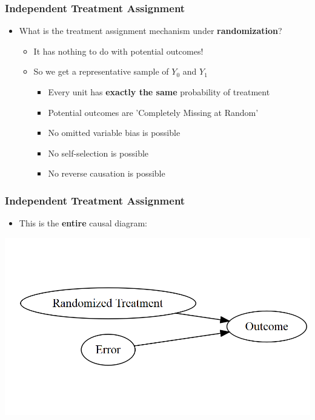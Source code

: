 \documentclass[xcolor=x11names,compress]{beamer}\usepackage[]{graphicx}\usepackage[]{color}
\makeatletter
\def\maxwidth{ %
  \ifdim\Gin@nat@width>\linewidth
    \linewidth
  \else
    \Gin@nat@width
  \fi
}
\newenvironment{knitrout}{}{} %
\renewcommand{\(}{\begin{columns}}
\renewcommand{\)}{\end{columns}}
\newcommand{\<}[1]{\begin{column}{#1}}
\renewcommand{\>}{\end{column}}
\makeatother
\begin{document}
\begin{frame}
\frametitle{Independent Treatment Assignment}
\begin{itemize}
\item What is the treatment assignment mechanism under \textbf{randomization}?
\pause
\begin{itemize}
\item It has nothing to do with potential outcomes!
\pause
\item So we get a representative sample of $Y_0$ and $Y_1$
\pause
\begin{itemize}
\item Every unit has \textbf{exactly the same} probability of treatment
\pause
\item Potential outcomes are 'Completely Missing at Random'
\pause
\item No omitted variable bias is possible
\item No self-selection is possible
\item No reverse causation is possible
\end{itemize}
\end{itemize}
\end{itemize}
\end{frame}

\begin{frame}
\frametitle{Independent Treatment Assignment}
\begin{itemize}
\item This is the \textbf{entire} causal diagram:
\end{itemize}
\pause
\begin{knitrout}
\color{fgcolor}
\includegraphics[width=\maxwidth]{figure/explanation1-1} 

\end{knitrout}
\end{frame}
\end{document}
